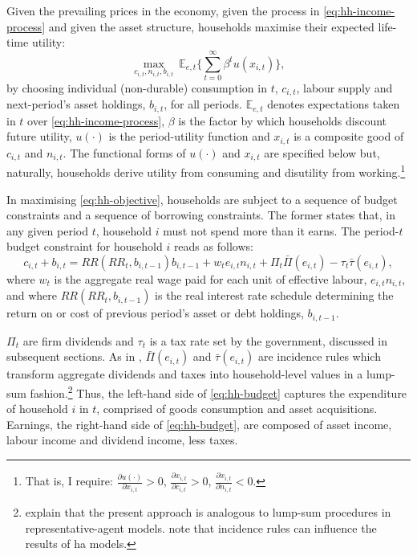 \documentclass[a4paper,12pt]{article} %
\numberwithin{equation}{section} %
\numberwithin{figure}{section}
\numberwithin{table}{section}
\begin{document}
Given the prevailing prices in the economy, given the process in \eqref{eq:hh-income-process} and given the asset structure, households maximise their expected life-time utility:
\begin{equation}
    \max_{c_{i,t}, n_{i,t}, b_{i,t}} \ \mathbb{E}_{e,t} \Bigg\{ \sum_{t=0}^{\infty} \beta^t u(x_{i,t}) \Bigg\}, \label{eq:hh-objective}
\end{equation}
by choosing individual (non-durable) consumption in $t$, $c_{i,t}$, labour supply and next-period's asset holdings, $b_{i,t}$, for all periods. $\mathbb{E}_{e,t}$ denotes expectations taken in $t$ over \eqref{eq:hh-income-process}, $\beta$ is the factor by which households discount future utility, $u( \cdot )$ is the period-utility function and $x_{i,t}$ is a composite good of $c_{i,t}$ and $n_{i,t}$. The functional forms of $u( \cdot )$ and $x_{i,t}$ are specified below but, naturally, households derive utility from consuming and disutility from working.\footnote{That is, I require: $\frac{\partial u( \cdot )}{\partial x_{i,t}} > 0$, $\frac{\partial x_{i,t}}{\partial c_{i,t}} > 0$, $\frac{\partial x_{i,t}}{\partial n_{i,t}} < 0$.} 

In maximising \eqref{eq:hh-objective}, households are subject to a sequence of budget constraints and a sequence of borrowing constraints. The former states that, in any given period $t$, household $i$ must not spend more than it earns. The period-$t$ budget constraint for household $i$ reads as follows: 
\begin{equation}
c_{i,t} + b_{i,t} = RR (RR_t, b_{i,t-1}) b_{i,t-1} + w_t e_{i,t} n_{i,t} + \Pi_t \bar{\Pi} (e_{i,t}) - \tau_t \bar{\tau} (e_{i,t}), \label{eq:hh-budget}
\end{equation}
where $w_t$ is the aggregate real wage paid for each unit of effective labour, $e_{i,t} n_{i,t}$, and where $RR (RR_t, b_{i,t-1})$ is the real interest rate schedule determining the return on or cost of previous period's asset or debt holdings, $b_{i,t-1}$. 

$\Pi_t$ are firm dividends and $\tau_t$ is a tax rate set by the government, discussed in subsequent sections. As in \textcite{mckay2016}, $\bar{\Pi} (e_{i,t})$ and $\bar{\tau} (e_{i,t})$ are incidence rules which transform aggregate dividends and taxes into household-level values in a lump-sum fashion.\footnote{\textcite{mckay2016} explain that the present approach is analogous to lump-sum procedures in representative-agent models. \textcite{kaplan2018} note that incidence rules can influence the results of \Gls{ha} models.} Thus, the left-hand side of \eqref{eq:hh-budget} captures the expenditure of household $i$ in $t$, comprised of goods consumption and asset acquisitions. Earnings, the right-hand side of \eqref{eq:hh-budget}, are composed of asset income, labour income and dividend income, less taxes.
\end{document}
